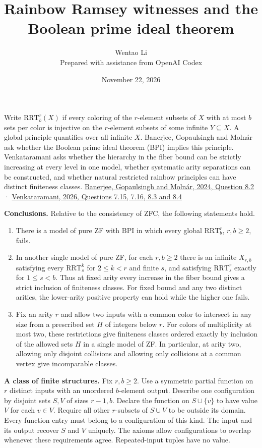 \documentclass[11pt]{article}
\author{Wentao Li\\\small Prepared with assistance from OpenAI Codex}
\date{November 22, 2026}
\title{Rainbow Ramsey witnesses and the Boolean prime ideal theorem}
\begin{document}
\maketitle
Write \(\mathrm{RRT}^r_b(X)\) if every coloring of the \(r\)-element subsets of \(X\) with at most \(b\) sets per color is injective on the \(r\)-element subsets of some infinite \(Y\subseteq X\). A global principle quantifies over all infinite \(X\). Banerjee, Gopaulsingh and Molnár ask whether the Boolean prime ideal theorem (BPI) implies this principle. Venkataramani asks whether the hierarchy in the fiber bound can be strictly increasing at every level in one model, whether systematic arity separations can be constructed, and whether natural restricted rainbow principles can have distinct finiteness classes. \href{https://arxiv.org/abs/2401.02215}{Banerjee, Gopaulsingh and Molnár, 2024, Question 8.2} · \href{https://arxiv.org/abs/2607.22196}{Venkataramani, 2026, Questions 7.15, 7.16, 8.3 and 8.4}

\textbf{Conclusions.} Relative to the consistency of ZFC, the following statements hold.

\begin{enumerate}
\def\labelenumi{\arabic{enumi}.}
\item
  There is a model of pure ZF with BPI in which every global \(\mathrm{RRT}^r_b\), \(r,b\ge2\), fails.
\item
  In another single model of pure ZF, for each \(r,b\ge2\) there is an infinite \(X_{r,b}\) satisfying every \(\mathrm{RRT}^k_s\) for \(2\le k<r\) and finite \(s\), and satisfying \(\mathrm{RRT}^r_s\) exactly for \(1\le s<b\). Thus at fixed arity every increase in the fiber bound gives a strict inclusion of finiteness classes. For fixed bound and any two distinct arities, the lower-arity positive property can hold while the higher one fails.
\item
  Fix an arity \(r\) and allow two inputs with a common color to intersect in any size from a prescribed set \(H\) of integers below \(r\). For colors of multiplicity at most two, these restrictions give finiteness classes ordered exactly by inclusion of the allowed sets \(H\) in a single model of ZF. In particular, at arity two, allowing only disjoint collisions and allowing only collisions at a common vertex give incomparable classes.
\end{enumerate}

\textbf{A class of finite structures.} Fix \(r,b\ge2\). Use a symmetric partial function on \(r\) distinct inputs with an unordered \(b\)-element output. Describe one configuration by disjoint sets \(S,V\) of sizes \(r-1,b\). Declare the function on \(S\cup\{v\}\) to have value \(V\) for each \(v\in V\). Require all other \(r\)-subsets of \(S\cup V\) to be outside its domain. Every function entry must belong to a configuration of this kind. The input and its output recover \(S\) and \(V\) uniquely. The axioms allow configurations to overlap whenever these requirements agree. Repeated-input tuples have no value.
\end{document}
